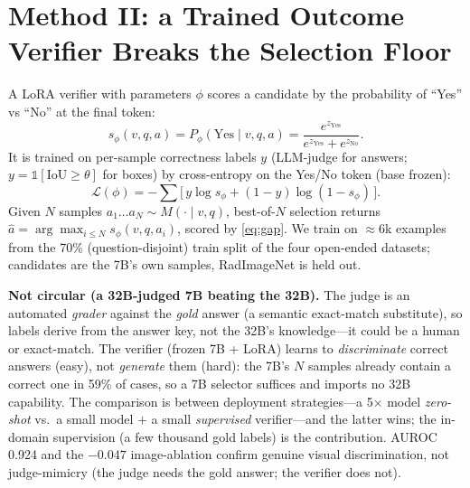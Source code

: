 \documentclass[conference]{IEEEtran}
\begin{document}
\section{Method II: a Trained Outcome Verifier Breaks the Selection Floor}\label{sec:verifier}
A LoRA verifier with parameters $\phi$ scores a candidate by the probability of ``Yes'' vs ``No'' at the final token:
\begin{equation}
s_\phi(v,q,a) = P_\phi(\text{Yes}\mid v,q,a) = \frac{e^{z_{\text{Yes}}}}{e^{z_{\text{Yes}}}+e^{z_{\text{No}}}}. \label{eq:verif}
\end{equation}
It is trained on per-sample correctness labels $y$ (LLM-judge for answers; $y{=}\mathbb{1}[\mathrm{IoU}\ge\theta]$ for boxes) by cross-entropy on the Yes/No token (base frozen):
\begin{equation}
\mathcal{L}(\phi) = -\!\sum \big[\,y\log s_\phi + (1{-}y)\log(1{-}s_\phi)\,\big]. \label{eq:loss}
\end{equation}
Given $N$ samples $a_1\ldots a_N\sim M(\cdot\mid v,q)$, best-of-$N$ selection returns $\hat a=\arg\max_{i\le N} s_\phi(v,q,a_i)$, scored by \eqref{eq:gap}. We train on ${\approx}6$k examples from the 70\% (question-disjoint) train split of the four open-ended datasets; candidates are the 7B's own samples, RadImageNet is held out.

\textbf{Not circular (a 32B-judged 7B beating the 32B).} The judge is an automated \emph{grader} against the \emph{gold} answer (a semantic exact-match substitute), so labels derive from the answer key, not the 32B's knowledge---it could be a human or exact-match. The verifier (frozen 7B + LoRA) learns to \emph{discriminate} correct answers (easy), not \emph{generate} them (hard): the 7B's $N$ samples already contain a correct one in 59\% of cases, so a 7B selector suffices and imports no 32B capability. The comparison is between deployment strategies---a 5$\times$ model \emph{zero-shot} vs.\ a small model $+$ a small \emph{supervised} verifier---and the latter wins; the in-domain supervision (a few thousand gold labels) is the contribution. AUROC 0.924 and the $-0.047$ image-ablation confirm genuine visual discrimination, not judge-mimicry (the judge needs the gold answer; the verifier does not).
\end{document}
